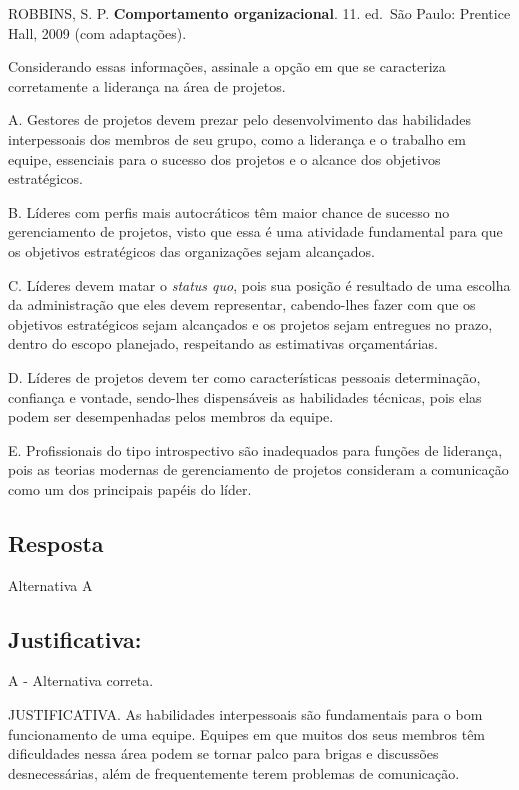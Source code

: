\documentclass[
]{book}
\begin{document}
ROBBINS, S. P. \textbf{Comportamento organizacional}. 11. ed.~São Paulo: Prentice Hall, 2009 (com adaptações).

Considerando essas informações, assinale a opção em que se caracteriza corretamente a liderança na área de projetos.

A. Gestores de projetos devem prezar pelo desenvolvimento das habilidades interpessoais dos membros de seu grupo, como a liderança e o trabalho em equipe, essenciais para o sucesso dos projetos e o alcance dos objetivos estratégicos.

B. Líderes com perfis mais autocráticos têm maior chance de sucesso no gerenciamento de projetos, visto que essa é uma atividade fundamental para que os objetivos estratégicos das organizações sejam alcançados.

C. Líderes devem matar o \emph{status quo}, pois sua posição é resultado de uma escolha da administração que eles devem representar, cabendo-lhes fazer com que os objetivos estratégicos sejam alcançados e os projetos sejam entregues no prazo, dentro do escopo planejado, respeitando as estimativas orçamentárias.

D. Líderes de projetos devem ter como características pessoais determinação, confiança e vontade, sendo-lhes dispensáveis as habilidades técnicas, pois elas podem ser desempenhadas pelos membros da equipe.

E. Profissionais do tipo introspectivo são inadequados para funções de liderança, pois as teorias modernas de gerenciamento de projetos consideram a comunicação como um dos principais papéis do líder.

\subsection{Resposta}\label{resposta-1}

Alternativa A

\subsection{Justificativa:}\label{justificativa-2}

A - Alternativa correta.

JUSTIFICATIVA. As habilidades interpessoais são fundamentais para o bom funcionamento de uma equipe. Equipes em que muitos dos seus membros têm dificuldades nessa área podem se tornar palco para brigas e discussões desnecessárias, além de frequentemente terem problemas de comunicação.
\end{document}
